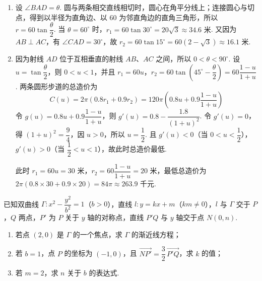 \begin{solution}
\begin{enumerate}
\item 设 \(\angle BAD=\theta\). 圆与两条相交直线相切时，圆心在角平分线上；连接圆心与切点，得到以半径为直角边、以 \(60\) 为邻直角边的直角三角形，所以 \(r=60\tan\dfrac{\theta}{2}\). 当 \(\theta=60^\circ\) 时，\(r_1=60\tan30^\circ=20\sqrt3\approx34.6\text{ 米}\). 又因为 \(AB\perp AC\)，有 \(\angle CAD=30^\circ\)，故 \(r_2=60\tan15^\circ=60(2-\sqrt3)\approx16.1\text{ 米}\).
\item 因为射线 \(AD\) 位于互相垂直的射线 \(AB\)、\(AC\) 之间，所以 \(0<\theta<90^\circ\). 设 \(u=\tan\dfrac{\theta}{2}\)，则 \(0<u<1\)，并且 \(r_1=60u\)，\(r_2=60\tan\left(45^\circ-\dfrac{\theta}{2}\right)=60\dfrac{1-u}{1+u}\). 两条圆形步道的总造价为
\[
C(u)=2\pi\left(0.8r_1+0.9r_2\right)=120\pi\left(0.8u+0.9\frac{1-u}{1+u}\right)
\]
令 \(g(u)=0.8u+0.9\dfrac{1-u}{1+u}\)，则 \(g'(u)=0.8-\dfrac{1.8}{(1+u)^2}\). 令 \(g'(u)=0\)，得 \((1+u)^2=\dfrac94\)，因 \(u>0\)，所以 \(u=\dfrac12\). 且 \(g'(u)<0\)（当 \(0<u<\dfrac12\)），\(g'(u)>0\)（当 \(\dfrac12<u<1\)），故此时总造价最低.

此时 \(r_1=60u=30\text{ 米}\)，\(r_2=60\dfrac{1-u}{1+u}=20\text{ 米}\)，最低总造价为 \(2\pi(0.8\times30+0.9\times20)=84\pi\approx263.9\text{ 千元}\).
\end{enumerate}
\end{solution}

\begin{problem}
已知双曲线 \(\Gamma:x^2-\dfrac{y^2}{b^2}=1\)（\(b>0\)），直线 \(l:y=kx+m\)（\(km\neq0\)），\(l\) 与 \(\Gamma\) 交于 \(P\)，\(Q\) 两点，\(P'\) 为 \(P\) 关于 \(y\) 轴的对称点，直线 \(P'Q\) 与 \(y\) 轴交于点 \(N(0,n)\).

\begin{enumerate}
\item 若点 \((2,0)\) 是 \(\Gamma\) 的一个焦点，求 \(\Gamma\) 的渐近线方程；
\item 若 \(b=1\)，点 \(P\) 的坐标为 \((-1,0)\)，且 \(\overrightarrow{NP'}=\dfrac32\,\overrightarrow{P'Q}\)，求 \(k\) 的值；
\item 若 \(m=2\)，求 \(n\) 关于 \(b\) 的表达式.
\end{enumerate}
\end{problem}

